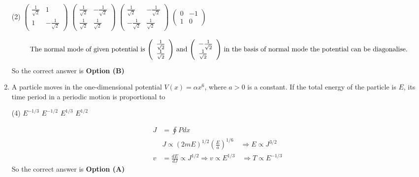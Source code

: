 \begin{enumerate}
\begin{tasks}(2)
	\task[\textbf{A.}] $\left(\begin{array}{cc}\frac{1}{\sqrt{2}} & 1 \\ 1 & -\frac{1}{\sqrt{2}}\end{array}\right)$
	\task[\textbf{B.}] $\left(\begin{array}{ll}\frac{1}{\sqrt{2}} & -\frac{1}{\sqrt{2}} \\ \frac{1}{\sqrt{2}} & \frac{1}{\sqrt{2}}\end{array}\right)$
	\task[\textbf{C.}] $\left(\begin{array}{cc}\frac{1}{\sqrt{2}} & -\frac{1}{\sqrt{2}} \\ -\frac{1}{\sqrt{2}} & \frac{1}{\sqrt{2}}\end{array}\right)$
	\task[\textbf{D.}] $\left(\begin{array}{cc}0 & -1 \\ 1 & 0\end{array}\right)$
\end{tasks}
\begin{answer}
	\begin{align*}
	\intertext{ The normal mode of given potential is $\left(\begin{array}{l}\frac{1}{\sqrt{2}} \\ \frac{1}{\sqrt{2}}\end{array}\right)$ and $\left(\begin{array}{l}-\frac{1}{\sqrt{2}} \\ \frac{1}{\sqrt{2}}\end{array}\right)$ in the basis of normal mode the potential can be diagonalise.}
	\end{align*}
	So the correct answer is \textbf{Option (B)}
\end{answer}
	\item  A particle moves in the one-dimensional potential $V(x)=\alpha x^{6}$, where $a>0$ is a constant. If the total energy of the particle is $E$, its time period in a periodic motion is proportional to
{	}
\begin{tasks}(4)
	\task[\textbf{A.}] $E^{-1 / 3}$
	\task[\textbf{B.}] $E^{-1 / 2}$
	\task[\textbf{C.}] $E^{1 / 3}$
	\task[\textbf{D.}] $E^{1 / 2}$
\end{tasks}
\begin{answer}
	\begin{align*}
	J&=\oint P d x\\
	&J \propto(2 m E)^{1 / 2}\left(\frac{E}{a}\right)^{1 / 6} \quad \Rightarrow E \propto J^{3 / 2} \\ v&=\frac{d E}{d J} \propto J^{1 / 2} \Rightarrow v \propto E^{1 / 3} \quad \Rightarrow T \propto E^{-1 / 3}
	\end{align*}
	So the correct answer is \textbf{Option (A)}
\end{answer}	
	
\end{enumerate}